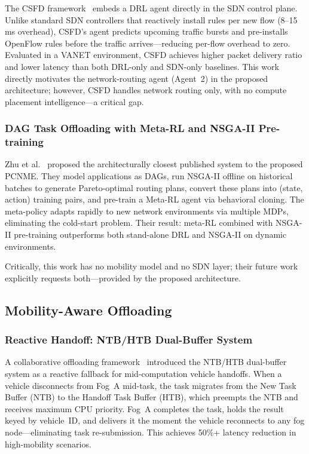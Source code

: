 \documentclass[12pt,a4paper]{article}
\begin{document}
The CSFD framework~\cite{csfd2025} embeds a DRL agent directly in the SDN control
plane. Unlike standard SDN controllers that reactively install rules per new flow
(8--15\,ms overhead), CSFD's agent predicts upcoming traffic bursts and
pre-installs OpenFlow rules before the traffic arrives---reducing per-flow overhead
to zero. Evaluated in a VANET environment, CSFD achieves higher packet delivery
ratio and lower latency than both DRL-only and SDN-only baselines. This work
directly motivates the network-routing agent (Agent~2) in the proposed
architecture; however, CSFD handles network routing only, with no compute
placement intelligence---a critical gap.

\subsubsection{DAG Task Offloading with Meta-RL and NSGA-II Pre-training}

Zhu et al.~\cite{zhu2025dag} proposed the architecturally closest published
system to the proposed PCNME. They model applications as DAGs, run NSGA-II
offline on historical batches to generate Pareto-optimal routing plans, convert
these plans into (state, action) training pairs, and pre-train a Meta-RL agent
via behavioral cloning. The meta-policy adapts rapidly to new network environments
via multiple MDPs, eliminating the cold-start problem. Their result: meta-RL
combined with NSGA-II pre-training outperforms both stand-alone DRL and NSGA-II
on dynamic environments.

Critically, this work has no mobility model and no SDN layer; their future work
explicitly requests both---provided by the proposed architecture.

\subsection{Mobility-Aware Offloading}

\subsubsection{Reactive Handoff: NTB/HTB Dual-Buffer System}

A collaborative offloading framework~\cite{paper5_mobility} introduced the
NTB/HTB dual-buffer system as a reactive fallback for mid-computation vehicle
handoffs. When a vehicle disconnects from Fog~A mid-task, the task migrates from
the New Task Buffer (NTB) to the Handoff Task Buffer (HTB), which preempts the
NTB and receives maximum CPU priority. Fog~A completes the task, holds the result
keyed by vehicle~ID, and delivers it the moment the vehicle reconnects to any fog
node---eliminating task re-submission. This achieves 50\%+ latency reduction in
high-mobility scenarios.
\end{document}
